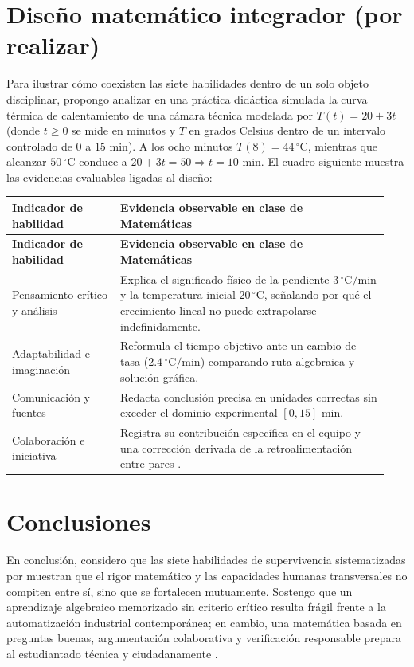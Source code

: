 \documentclass[spanish,letterpaper,oneside]{article}
\begin{document}
\section{Diseño matemático integrador (por realizar)}
Para ilustrar cómo coexisten las siete habilidades dentro de un solo objeto disciplinar, propongo analizar en una práctica didáctica simulada la curva térmica de calentamiento de una cámara técnica modelada por $T(t) = 20 + 3t$ (donde $t \ge 0$ se mide en minutos y $T$ en grados Celsius dentro de un intervalo controlado de $0$ a $15\text{ min}$). A los ocho minutos $T(8) = 44\,^\circ\text{C}$, mientras que alcanzar $50\,^\circ\text{C}$ conduce a $20 + 3t = 50 \Rightarrow t = 10\text{ min}$. El cuadro siguiente muestra las evidencias evaluables ligadas al diseño:

{\small{}\renewcommand{\arraystretch}{1.32}
\begin{longtable}{|>{\raggedright\arraybackslash}p{0.27\linewidth}|>{\raggedright\arraybackslash}p{0.67\linewidth}|}\hline
\rowcolor{iiiepePale} \textbf{Indicador de habilidad} & \textbf{Evidencia observable en clase de Matemáticas} \\\hline
\endfirsthead
\hline
\rowcolor{iiiepePale} \textbf{Indicador de habilidad} & \textbf{Evidencia observable en clase de Matemáticas} \\\hline
\endhead
Pensamiento crítico y análisis & Explica el significado físico de la pendiente $3\,^\circ\text{C/min}$ y la temperatura inicial $20\,^\circ\text{C}$, señalando por qué el crecimiento lineal no puede extrapolarse indefinidamente. \\\hline
Adaptabilidad e imaginación & Reformula el tiempo objetivo ante un cambio de tasa ($2.4\,^\circ\text{C/min}$) comparando ruta algebraica y solución gráfica. \\\hline
Comunicación y fuentes & Redacta conclusión precisa en unidades correctas sin exceder el dominio experimental $[0, 15]\text{ min}$. \\\hline
Colaboración e iniciativa & Registra su contribución específica en el equipo y una corrección derivada de la retroalimentación entre pares \citep{eef2021feedback}. \\\hline
\end{longtable}}

\clearpage
\section{Conclusiones}
En conclusión, considero que las siete habilidades de supervivencia sistematizadas por \citet{wagner2010survival} muestran que el rigor matemático y las capacidades humanas transversales no compiten entre sí, sino que se fortalecen mutuamente. Sostengo que un aprendizaje algebraico memorizado sin criterio crítico resulta frágil frente a la automatización industrial contemporánea; en cambio, una matemática basada en preguntas buenas, argumentación colaborativa y verificación responsable prepara al estudiantado técnica y ciudadanamente \citep{sep2022plan,scott2015futuro2}.
\end{document}
